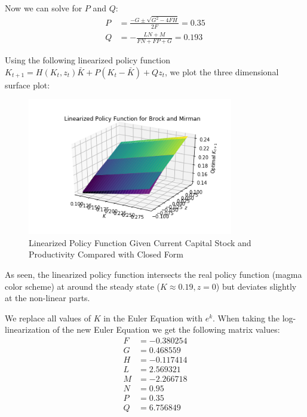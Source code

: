 \documentclass[letterpaper,11pt]{article}
\theoremstyle{definition}
\begin{document}
\begin{spacing}{1.5}
\begin{Exercise}
		Now we can solve for $P$ and $Q$:
		\begin{align*}
			P &= \frac{-G \pm \sqrt{G^2-4FH}}{2F} = 0.35 \\
			Q &= -\frac{LN+M}{FN+FP+G} = 0.193
		\end{align*}

		Using the following linearized policy function $K_{t+1} = H(K_t,z_t) \bar{K}+P(K_t-\bar{K})+Qz_t$, we plot the three dimensional surface plot:

		\begin{figure}[H]
			\caption{Linearized Policy Function Given Current Capital Stock and Productivity Compared with Closed Form}
			\label{fig:brock_and_mirman}
			\includegraphics[width=0.8\textwidth]{Brock_and_Merman_linearized_policy.png}
		\end{figure}

		As seen, the linearized policy function intersects the real policy function (magma color scheme) at around the steady state ($K \approx 0.19, z = 0$) but deviates slightly at the non-linear parts.
	\end{Exercise}

	\begin{Exercise} \label{Linear_HW_BM_Coeffs_Log}
		We replace all values of $K$ in the Euler Equation with $e^k$. When taking the log-linearization of the new Euler Equation we get the following matrix values:
		\begin{align*}
			F&= -0.380254 \\
			G&= 0.468559 \\
			H&= -0.117414 \\
			L&= 2.569321 \\
			M&= -2.266718 \\
			N&=0.95 \\
			P&= 0.35 \\
			Q&= 6.756849
		\end{align*}
	\end{Exercise}


\end{spacing}
\end{document}
